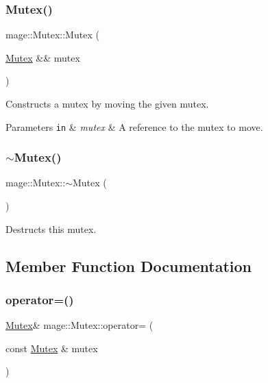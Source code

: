 \subsubsection{\texorpdfstring{Mutex()}{Mutex()}\hspace{0.1cm}{\footnotesize\ttfamily [3/3]}}
{\footnotesize\ttfamily mage\+::\+Mutex\+::\+Mutex (\begin{DoxyParamCaption}\item[{\hyperlink{structmage_1_1_mutex}{Mutex} \&\&}]{mutex }\end{DoxyParamCaption})\hspace{0.3cm}{\ttfamily [default]}}

Constructs a mutex by moving the given mutex.


\begin{DoxyParams}[1]{Parameters}
\mbox{\tt in}  & {\em mutex} & A reference to the mutex to move. \\
\hline
\end{DoxyParams}
\hypertarget{structmage_1_1_mutex_a143d82ec7bb43f953a1703caa7972e9d}{}\label{structmage_1_1_mutex_a143d82ec7bb43f953a1703caa7972e9d} 
\subsubsection{\texorpdfstring{$\sim$\+Mutex()}{~Mutex()}}
{\footnotesize\ttfamily mage\+::\+Mutex\+::$\sim$\+Mutex (\begin{DoxyParamCaption}{ }\end{DoxyParamCaption})}

Destructs this mutex. 

\subsection{Member Function Documentation}
\hypertarget{structmage_1_1_mutex_a56072bdabdeadd5d897de232dbd298a0}{}\label{structmage_1_1_mutex_a56072bdabdeadd5d897de232dbd298a0} 
\subsubsection{\texorpdfstring{operator=()}{operator=()}\hspace{0.1cm}{\footnotesize\ttfamily [1/2]}}
{\footnotesize\ttfamily \hyperlink{structmage_1_1_mutex}{Mutex}\& mage\+::\+Mutex\+::operator= (\begin{DoxyParamCaption}\item[{const \hyperlink{structmage_1_1_mutex}{Mutex} \&}]{mutex }\end{DoxyParamCaption})\hspace{0.3cm}{\ttfamily [delete]}}

